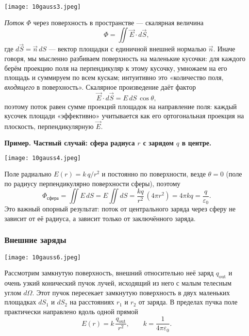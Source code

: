 \documentclass[12pt, a4paper]{article}%
\begin{document}
\begin{center}
\texttt{[image: 10gauss3.jpeg]}
\label{fig:mpr}
\end{center}

\textit{Поток} $\Phi$ через поверхность в пространстве — скалярная величина
\[
\Phi = \iint \vec E\cdot d\vec S,
\]
где $d\vec S = \vec n\,dS$ — вектор площадки с единичной внешней нормалью $\vec n$.  Иначе говоря, мы мысленно разбиваем поверхность на маленькие кусочки: для каждого берём проекцию поля на перпендикуляр к этому кусочку, умножаем на его площадь и суммируем по всем кускам; интуитивно это «количество поля, \textit{входящего} в поверхность».
 Скалярное произведение даёт фактор
\[
\vec E\cdot d\vec S = E\,dS\,\cos\theta,
\]
поэтому поток равен сумме проекций площадок на направление поля: каждый кусочек площади «эффективно» учитывается как его ортогональная проекция на плоскость, перпендикулярную $\vec E$.

\textbf{Пример. Частный случай: сфера радиуса $r$ с зарядом $q$ в центре.}

\begin{center}
\texttt{[image: 10gauss4.jpeg]}
\label{fig:mpr}
\end{center}

Поле радиально $E(r)=k\,q/r^2$ и постоянно по поверхности, везде $\theta=0$ (поле по радиусу перпендикулярно поверхности сферы), поэтому
\[
\Phi_{\text{сфера}}=\iint E\,dS = E\iint dS = \frac{kq}{r^2}\,(4\pi r^2)=4\pi k q=\frac{q}{\varepsilon_0}.
\]
Это важный опорный результат: поток от центрального заряда через сферу не зависит от её радиуса, а зависит только от заключённого заряда.

\subsubsection*{Внешние заряды}

\begin{center}
\texttt{[image: 10gauss6.jpeg]}
\label{fig:mpr}
\end{center}

Рассмотрим замкнутую поверхность, внешний относительно неё заряд \(q_{\text{out}}\) и очень узкий конический пучок лучей, исходящий из него с малым телесным углом \(d\Omega\). Этот пучок пересекает замкнутую поверхность в двух маленьких площадках \(dS_1\) и \(dS_2\) на расстояниях \(r_1\) и \(r_2\) от заряда. В пределах пучка поле практически направлено вдоль одной прямой
\[
E(r)=k\,\frac{q_{\text{out}}}{r^2}, \qquad k=\frac{1}{4\pi\varepsilon_0}.
\]
\end{document}
